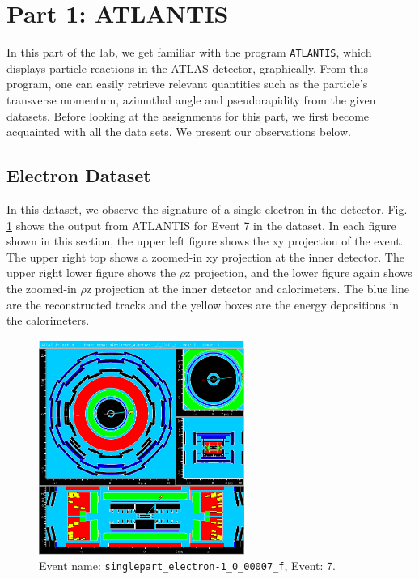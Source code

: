 \documentclass[a4paper]{report}
\numberwithin{equation}{section}
\begin{document}
\section{Part 1: ATLANTIS} \label{sec:atlantis}

In this part of the lab, we get familiar with the program \texttt{ATLANTIS}, which displays particle reactions in the ATLAS detector, graphically. 
From this program, one can easily retrieve relevant quantities such as the particle's transverse momentum, azimuthal angle and pseudorapidity
from the given datasets. 
Before looking at the assignments for this part, we first become acquainted with all the data sets. We present our observations below. 

\subsection{Electron Dataset}

In this dataset, we observe the signature of a single electron in the detector. Fig. \ref{fig:single_e} shows the output from ATLANTIS for Event 7 in the 
dataset. In each figure shown in this section, the upper left figure shows the xy projection of the 
event. The upper right top shows a zoomed-in xy projection at the inner detector. The upper right lower figure shows the $\rho$z 
projection, and the lower figure again shows the zoomed-in $\rho$z projection at the inner detector and calorimeters. The blue line
 are the reconstructed tracks and the yellow boxes are the energy depositions in the calorimeters. 

\begin{figure}[htpb]
    \centering
    \includegraphics[width=0.6\textwidth]{electron_event7.eps}
    \caption{Event name: \texttt{singlepart\_electron-1\_0\_00007\_f}, Event: 7. }
    \label{fig:single_e}
\end{figure}
\end{document}

